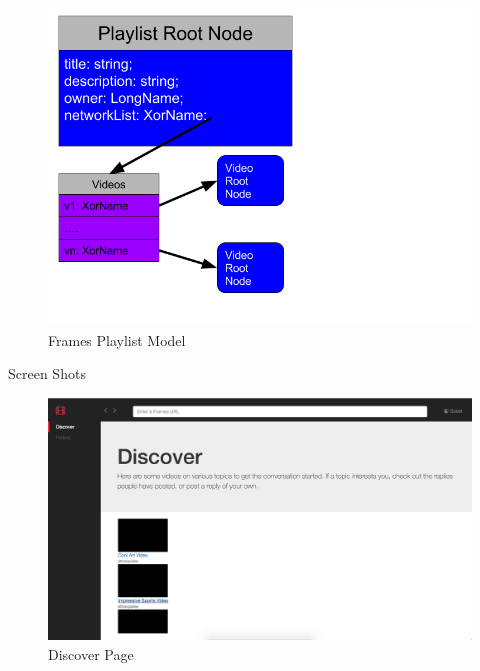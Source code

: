 \documentclass[final]{beamer}
\newlength{\onecolwid}
\newlength{\twocolwid}
\begin{document}
\begin{frame}[t]
\begin{columns}[t]
\begin{column}{\twocolwid}
\begin{columns}[t,totalwidth=\twocolwid]
\begin{column}{\onecolwid}
\begin{block}{}
  \begin{figure}
  \includegraphics[width=0.8\linewidth]{playlist-model.png}
  \caption{Frames Playlist Model}
  \label{fig:playlist-model}
  \end{figure}

\end{block}

\begin{block}{Screen Shots}

  \begin{figure}
  \includegraphics[width=0.8\linewidth]{discover-page.png}
  \caption{Discover Page}
  \label{fig:discover-page}
  \end{figure}

\end{block}

\end{column} %

\end{columns} %



\end{column}
\end{columns}
\end{frame}
\end{document}
